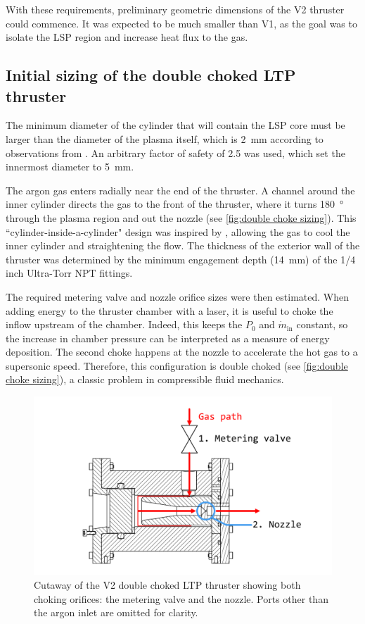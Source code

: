             With these requirements, preliminary geometric dimensions of the V2 thruster could commence. It was expected to be much smaller than V1, as the goal was to isolate the LSP region and increase heat flux to the gas.

        \subsection{Initial sizing of the double choked LTP thruster}

            The minimum diameter of the cylinder that will contain the LSP core must be larger than the diameter of the plasma itself, which is \qty{2}{mm} according to observations from \textcite{duplayArgonLaserPlasmaThruster2024a}. An arbitrary factor of safety of 2.5 was used, which set the innermost diameter to \qty{5}{mm}.

            The argon gas enters radially near the end of the thruster. A channel around the inner cylinder directs the gas to the front of the thruster, where it turns \qty{180}{\degree} through the plasma region and out the nozzle (see \autoref{fig:double choke sizing}). This ``cylinder-inside-a-cylinder" design was inspired by \textcite{toyodaThrustPerformanceCW2002}, allowing the gas to cool the inner cylinder and straightening the flow. The thickness of the exterior wall of the thruster was determined by the minimum engagement depth (\qty{14}{mm}) of the 1/4 inch Ultra-Torr NPT fittings.

            The required metering valve and nozzle orifice sizes were then estimated. When adding energy to the thruster chamber with a laser, it is useful to choke the inflow upstream of the chamber. Indeed, this keeps the $P_0$ and $\dot{m}_\mathrm{in}$ constant, so the increase in chamber pressure can be interpreted as a measure of energy deposition. The second choke happens at the nozzle to accelerate the hot gas to a supersonic speed. Therefore, this configuration is double choked (see \autoref{fig:double choke sizing}), a classic problem in compressible fluid mechanics.

            \begin{figure}[h]
                \centering
                \includegraphics[width=0.8\linewidth]{assets/3 design/Double choked LTP thruster.pdf}
                \caption{Cutaway of the V2 double choked LTP thruster showing both choking orifices: the metering valve and the nozzle. Ports other than the argon inlet are omitted for clarity.}
                \label{fig:double choke sizing}
            \end{figure}
            
